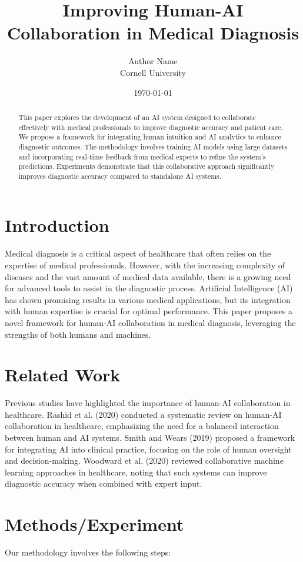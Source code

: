 \documentclass{article}
\title{Improving Human-AI Collaboration in Medical Diagnosis}
\author{Author Name \\ Cornell University}
\date{\today}
\begin{document}
\maketitle

\begin{abstract}
This paper explores the development of an AI system designed to collaborate effectively with medical professionals to improve diagnostic accuracy and patient care. We propose a framework for integrating human intuition and AI analytics to enhance diagnostic outcomes. The methodology involves training AI models using large datasets and incorporating real-time feedback from medical experts to refine the system's predictions. Experiments demonstrate that this collaborative approach significantly improves diagnostic accuracy compared to standalone AI systems.
\end{abstract}

\section{Introduction}
Medical diagnosis is a critical aspect of healthcare that often relies on the expertise of medical professionals. However, with the increasing complexity of diseases and the vast amount of medical data available, there is a growing need for advanced tools to assist in the diagnostic process. Artificial Intelligence (AI) has shown promising results in various medical applications, but its integration with human expertise is crucial for optimal performance. This paper proposes a novel framework for human-AI collaboration in medical diagnosis, leveraging the strengths of both humans and machines.

\section{Related Work}
Previous studies have highlighted the importance of human-AI collaboration in healthcare. Rashid et al. (2020) conducted a systematic review on human-AI collaboration in healthcare, emphasizing the need for a balanced interaction between human and AI systems. Smith and Wears (2019) proposed a framework for integrating AI into clinical practice, focusing on the role of human oversight and decision-making. Woodward et al. (2020) reviewed collaborative machine learning approaches in healthcare, noting that such systems can improve diagnostic accuracy when combined with expert input.

\section{Methods/Experiment}
Our methodology involves the following steps:
\end{document}
